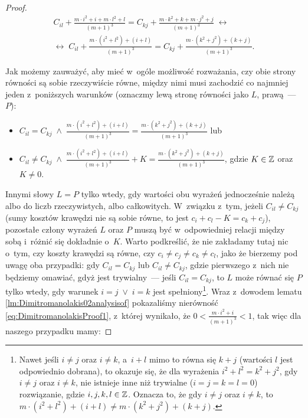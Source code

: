 \begin{proof}
	\begin{gather}
		C_{il} + \frac{m \cdot i^{2} + i + m \cdot l^{2} + l}{\left( m + 1 \right)^{3}} = C_{kj} + \frac{m \cdot k^{2} + k + m \cdot j^{2} + j}{\left( m + 1 \right)^{3}} \; \leftrightarrow \\
		\leftrightarrow \; C_{il} + \frac{m \cdot \left( i^{2} + l^{2} \right) + \left( i + l \right)}{\left( m + 1 \right)^{3}} = C_{kj} + \frac{m \cdot \left( k^{2} + j^{2} \right) + \left( k + j \right)}{\left( m + 1 \right)^{3}}\text{.}
	\end{gather}
	
	Jak możemy zauważyć, aby mieć w~ogóle możliwość rozważania, czy obie strony równości są sobie rzeczywiście równe, między nimi musi zachodzić co najmniej jeden z~poniższych warunków (oznaczmy lewą stronę równości jako $L$, prawą~--- $P$):
	
	\begin{itemize}
		\item $C_{il} = C_{kj} \; \wedge \; \frac{m \cdot \left( i^{2} + l^{2} \right) + \left( i + l \right)}{\left( m + 1 \right)^{3}} = \frac{m \cdot \left( k^{2} + j^{2} \right) + \left( k + j \right)}{\left( m + 1 \right)^{3}}$ lub
		\item $C_{il} \neq C_{kj} \; \wedge \; \frac{m \cdot \left( i^{2} + l^{2} \right) + \left( i + l \right)}{\left( m + 1 \right)^{3}} + K = \frac{m \cdot \left( k^{2} + j^{2} \right) + \left( k + j \right)}{\left( m + 1 \right)^{3}}$, gdzie $K \in \mathbb{Z}$ oraz $K \neq 0$.
	\end{itemize}
	
	Innymi słowy $L = P$ tylko wtedy, gdy wartości obu wyrażeń jednocześnie należą albo do liczb rzeczywistych, albo całkowitych. 
	W~związku z~tym, jeżeli $C_{il} \neq C_{kj}$ (sumy kosztów krawędzi nie są sobie równe, to jest $c_{i} + c_{l} - K = c_{k} + c_{j}$), pozostałe człony wyrażeń $L$ oraz $P$ muszą być w~odpowiedniej relacji między sobą i~różnić się dokładnie o~$K$.
	Warto podkreślić, że nie zakładamy tutaj nic o~tym, czy koszty krawędzi są równe, czy $c_{i} \neq c_{j} \neq c_{k} \neq c_{l}$, jako że bierzemy pod uwagę oba przypadki: gdy $C_{il} = C_{kj}$ lub $C_{il} \neq C_{kj}$, gdzie pierwszego z~nich nie będziemy omawiać, gdyż jest trywialny~--- jeśli $C_{il} = C_{kj}$, to $L$ może równać się $P$ tylko wtedy, gdy warunek $i = j \; \vee \; i = k$ jest spełniony\footnote{
		Nawet jeśli $i \neq j$ oraz $i \neq k$, a~$i + l$ mimo to równa się $k + j$ (wartości $l$ jest odpowiednio dobrana), to okazuje się, że dla wyrażenia $i^{2} + l^{2} = k^{2} + j^{2}$, gdy $i \neq j$ oraz $i \neq k$, nie istnieje inne niż trywialne ($i = j = k = l = 0$) rozwiązanie, gdzie $i, j, k, l \in \mathbb{Z}$.
		Oznacza to, że gdy $i \neq j$ oraz $i \neq k$, to $m \cdot \left( i^{2} + l^{2} \right) + \left( i + l \right) \neq m \cdot \left( k^{2} + j^{2} \right) + \left( k + j \right)$.
	}.
	Wraz z~dowodem lematu \ref{lm:Dimitromanolakis02analysisof} pokazaliśmy nierówność \ref{eq:DimitromanolakisProof1}, z~której wynikało, że $0 < \frac{m \cdot i^{2} + i}{\left( m + 1 \right)^{3}} < 1$, tak więc dla naszego przypadku mamy:
	

\end{proof}
